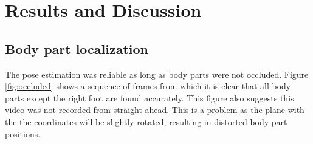 \chapter{Results and Discussion} \label{ch:results}
\section{Body part localization}
The pose estimation was reliable as long as body parts were not occluded. Figure \ref{fig:occluded} shows a sequence of frames from which it is clear that all body parts except the right foot are found accurately. This figure also suggests this video was not recorded from straight ahead. This is a problem as the plane with the the coordinates will be slightly rotated, resulting in distorted body part positions.

